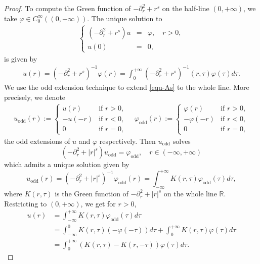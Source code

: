 \documentclass[%
11pt,  reqno]{amsart}
\theoremstyle{remarkstyle}
\newcommand{\1}{\hspace{0.2mm}\text{I}\hspace{0.2mm}}
\newcommand{\R}{\mathbb{R}}
\numberwithin{equation}{section}
\numberwithin{theorem}{section}
\begin{document}
\begin{proof}
		To compute the Green function of $-\partial^2_r +r^s$ on the half-line $(0,+\infty)$, we take $\varphi \in C^\infty_0((0,+\infty))$. The unique solution to 
		\begin{align} \label{equ-As}
			\left\{
			\begin{array}{rcl}
				(-\partial^2_r + r^s) u &=& \varphi, \quad r>0, \\
				u(0) &=& 0,
			\end{array}
			\right.
		\end{align}
		is given by
		\begin{align} \label{As}
			u(r) = (-\partial^2_r +r^s)^{-1}\varphi(r) = \int_0^{+\infty} (-\partial^2_r+r^s)^{-1}(r,\tau) \varphi(\tau) d\tau.
		\end{align}
		We use the odd extension technique to extend \eqref{equ-As} to the whole line. More precisely, we denote
		\begin{align} \label{odd-exte-u}
			u_{\text{odd}}(r) := \left\{
			\begin{array}{cl}
				u(r) &\text{if } r>0, \\
				-u(-r) &\text{if } r<0, \\
				0 &\text{if } r=0,
			\end{array}
			\right. \quad \varphi_{\text{odd}}(r) :=\left\{
			\begin{array}{cl}
				\varphi(r) &\text{if } r>0, \\
				-\varphi(-r) &\text{if } r<0, \\
				0 &\text{if } r=0,
			\end{array}
			\right. 
		\end{align}
		the odd extensions of $u$ and $\varphi$ respectively. Then $u_{\text{odd}}$ solves
		\[
		(-\partial^2_r +|r|^s) u_{\text{odd}} = \varphi_{\text{odd}}, \quad r \in (-\infty, +\infty)
		\]
		which admits a unique solution given by
		\[
		u_{\text{odd}}(r) = (-\partial^2_r + |r|^s)^{-1} \varphi_{\text{odd}}(r) = \int_{-\infty}^{+\infty} K(r,\tau) \varphi_{\text{odd}}(\tau) d\tau,
		\]
		where $K(r,\tau)$ is the Green function of $-\partial^2_r +|r|^s$ on the whole line $\R$. Restricting to $(0,+\infty)$, we get for $r>0$,
		\begin{align*}
			u(r) &= \int_{-\infty}^{+\infty} K(r,\tau) \varphi_{\text{odd}}(\tau) d\tau \\
			&= \int_{-\infty}^0 K(r,\tau) \left(-\varphi(-\tau)\right) d\tau + \int_0^{+\infty} K(r,\tau) \varphi(\tau) d\tau \\
			&= \int_0^{+\infty} \left(K(r,\tau) - K(r,-\tau) \right) \varphi(\tau) d\tau.

\end{align*}
\end{proof}
\end{document}
